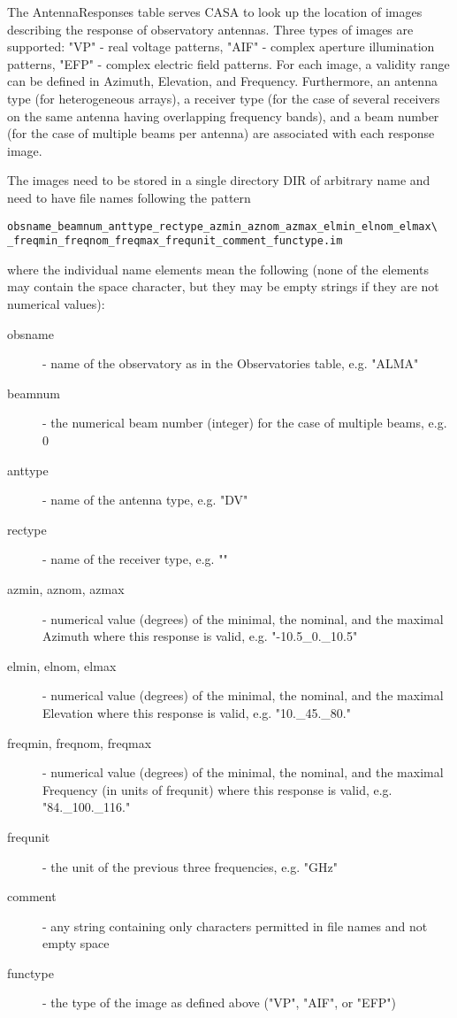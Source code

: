 \documentclass[12pt]{article}
\begin{document}
\begin{description}
   
The AntennaResponses table serves CASA to look up the location of images describing the
response of observatory antennas. Three types of images are supported: "VP" - real voltage patterns,
"AIF" - complex aperture illumination patterns, "EFP" - complex electric field patterns.
For each image, a validity range can be defined in Azimuth, Elevation, and Frequency.
Furthermore, an antenna type (for heterogeneous arrays), a receiver type (for the case of
several receivers on the same antenna having overlapping frequency bands), and a beam number
(for the case of multiple beams per antenna) are associated with each response image.

The images need to be stored in a single directory DIR of arbitrary name and need to
have file names following the pattern
{\small
\begin{verbatim}
obsname_beamnum_anttype_rectype_azmin_aznom_azmax_elmin_elnom_elmax\
_freqmin_freqnom_freqmax_frequnit_comment_functype.im
\end{verbatim}
}
where the individual name elements mean the following (none of the elements may contain 
the space character, but they may be empty strings if they are not numerical values):
\begin{description}
\item[obsname] - name of the observatory as in the Observatories table, e.g. "ALMA"
\item[beamnum] - the numerical beam number (integer) for the case of multiple beams, e.g. 0
\item[anttype] - name of the antenna type, e.g. "DV"
\item[rectype] - name of the receiver type, e.g. ""
\item[azmin, aznom, azmax] - numerical value (degrees) of the minimal, the nominal, and 
  the maximal Azimuth where this response is valid, e.g. "-10.5\_0.\_10.5"
\item[elmin, elnom, elmax] - numerical value (degrees) of the minimal, the nominal, and 
  the maximal Elevation where this response is valid, e.g. "10.\_45.\_80."
\item[freqmin, freqnom, freqmax] - numerical value (degrees) of the minimal, the nominal, and 
  the maximal Frequency (in units of frequnit) where this response is valid, e.g. "84.\_100.\_116."
\item[frequnit] - the unit of the previous three frequencies, e.g. "GHz"
\item[comment] - any string containing only characters permitted in file names and not empty space
\item[functype] - the type of the image as defined above ("VP", "AIF", or "EFP")
 \end{description}


\end{description}
\end{document}
